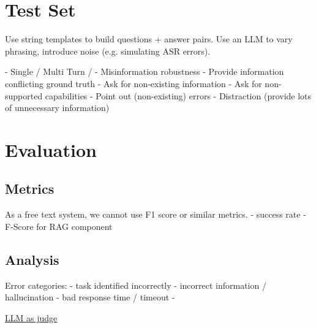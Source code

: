 \documentclass{article}
\begin{document}
\section{Test Set}

Use string templates to build questions + answer pairs. Use an LLM to vary phrasing, introduce noise (e.g. simulating ASR errors).

- Single / Multi Turn / 
- Misinformation robustness
    - Provide information conflicting ground truth
    - Ask for non-existing information
    - Ask for non-supported capabilities
    - Point out (non-existing) errors
    - Distraction (provide lots of unnecessary information)

\section{Evaluation}
\subsection{Metrics}
As a free text system, we cannot use F1 score or similar metrics.
- success rate
- F-Score for RAG component

\subsection{Analysis}
Error categories:
- task identified incorrectly
- incorrect information / hallucination
- bad response time / timeout
- 


\href{https://ai.pydantic.dev/evals/#evaluation-with-llmjudge}{LLM as judge}
\end{document}
